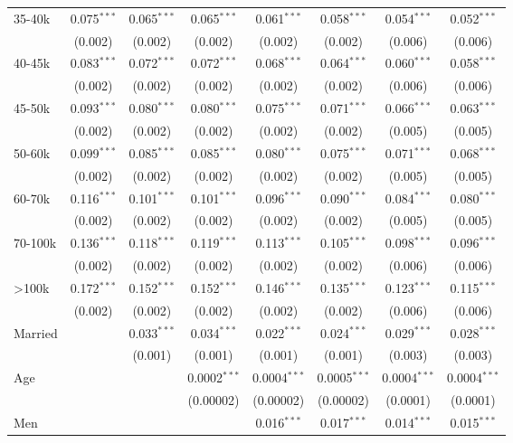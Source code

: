 \begin{table}[!htbp]
\begin{tabular}{@{\extracolsep{5pt}}lccccccc}
  35-40k & 0.075$^{***}$ & 0.065$^{***}$ & 0.065$^{***}$ & 0.061$^{***}$ & 0.058$^{***}$ & 0.054$^{***}$ & 0.052$^{***}$ \\ 
  & (0.002) & (0.002) & (0.002) & (0.002) & (0.002) & (0.006) & (0.006) \\ 
  40-45k & 0.083$^{***}$ & 0.072$^{***}$ & 0.072$^{***}$ & 0.068$^{***}$ & 0.064$^{***}$ & 0.060$^{***}$ & 0.058$^{***}$ \\ 
  & (0.002) & (0.002) & (0.002) & (0.002) & (0.002) & (0.006) & (0.006) \\ 
  45-50k & 0.093$^{***}$ & 0.080$^{***}$ & 0.080$^{***}$ & 0.075$^{***}$ & 0.071$^{***}$ & 0.066$^{***}$ & 0.063$^{***}$ \\ 
  & (0.002) & (0.002) & (0.002) & (0.002) & (0.002) & (0.005) & (0.005) \\ 
  50-60k & 0.099$^{***}$ & 0.085$^{***}$ & 0.085$^{***}$ & 0.080$^{***}$ & 0.075$^{***}$ & 0.071$^{***}$ & 0.068$^{***}$ \\ 
  & (0.002) & (0.002) & (0.002) & (0.002) & (0.002) & (0.005) & (0.005) \\ 
  60-70k & 0.116$^{***}$ & 0.101$^{***}$ & 0.101$^{***}$ & 0.096$^{***}$ & 0.090$^{***}$ & 0.084$^{***}$ & 0.080$^{***}$ \\ 
  & (0.002) & (0.002) & (0.002) & (0.002) & (0.002) & (0.005) & (0.005) \\ 
  70-100k & 0.136$^{***}$ & 0.118$^{***}$ & 0.119$^{***}$ & 0.113$^{***}$ & 0.105$^{***}$ & 0.098$^{***}$ & 0.096$^{***}$ \\ 
  & (0.002) & (0.002) & (0.002) & (0.002) & (0.002) & (0.006) & (0.006) \\ 
  >100k & 0.172$^{***}$ & 0.152$^{***}$ & 0.152$^{***}$ & 0.146$^{***}$ & 0.135$^{***}$ & 0.123$^{***}$ & 0.115$^{***}$ \\ 
  & (0.002) & (0.002) & (0.002) & (0.002) & (0.002) & (0.006) & (0.006) \\ 
  Married &  & 0.033$^{***}$ & 0.034$^{***}$ & 0.022$^{***}$ & 0.024$^{***}$ & 0.029$^{***}$ & 0.028$^{***}$ \\ 
  &  & (0.001) & (0.001) & (0.001) & (0.001) & (0.003) & (0.003) \\ 
  Age &  &  & 0.0002$^{***}$ & 0.0004$^{***}$ & 0.0005$^{***}$ & 0.0004$^{***}$ & 0.0004$^{***}$ \\ 
  &  &  & (0.00002) & (0.00002) & (0.00002) & (0.0001) & (0.0001) \\ 
  Men &  &  &  & 0.016$^{***}$ & 0.017$^{***}$ & 0.014$^{***}$ & 0.015$^{***}$ \\ 

\end{tabular}
\end{table}
